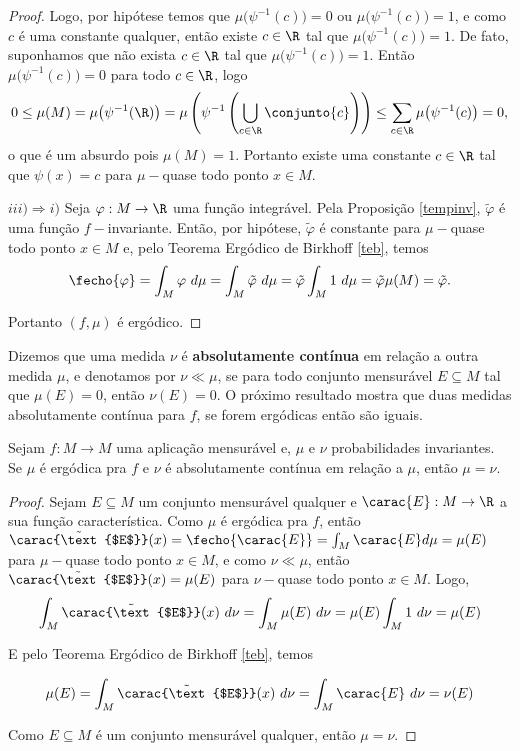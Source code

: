 \begin{proof}
Logo, por hipótese temos que $\mu\big(\psi^{-1}(c)\big)=0$ ou $\mu\big(\psi^{-1}(c)\big)=1$, e como $c$ é uma constante qualquer, então existe $c\in\R$ tal que $\mu\big(\psi^{-1}(c)\big)=1$. De fato, suponhamos que não exista $c\in\R$ tal que $\mu\big(\psi^{-1}(c)\big)=1$. Então $\mu\big(\psi^{-1}(c)\big)=0$ para todo $c\in\R$, logo
\begin{equation*}
0\leq\mu(M)=\mu\big(\psi^{-1}(\R)\big)=\mu\left(\psi^{-1}\left(\bigcup_{c\in\R}\conjunto{c}\right)\right)\leq\sum_{c\in\R}\mu\big(\psi^{-1}(c)\big)=0,
\end{equation*}
o que é um absurdo pois $\mu(M)=1$. Portanto existe uma constante $c\in\R$ tal que $\psi(x)=c$ para $\mu-$quase todo ponto $x\in M$.

$iii) \Rightarrow i)$ Seja $\varphi:M\to\R$ uma função integrável. Pela Proposição \ref{tempinv}, $\tilde{\varphi}$ é uma função $f-$invariante. Então, por hipótese, $\tilde{\varphi}$ é constante para $\mu-$quase todo ponto $x\in M$ e, pelo Teorema Ergódico de Birkhoff \ref{teb}, temos
\begin{equation*}
\fecho{\varphi}=\int_{M}{\varphi\ d\mu}=\int_{M}{\tilde{\varphi}\ d\mu}=\tilde{\varphi}\int_{M}{1\ d\mu}=\tilde{\varphi}\mu(M)=\tilde{\varphi}.
\end{equation*}

Portanto $(f,\mu)$ é ergódico.
\end{proof}

Dizemos que uma medida $\nu$ é \textbf{absolutamente contínua} em relação a outra medida $\mu$, e denotamos por $\nu\ll\mu$, se para todo conjunto mensurável $E\subseteq M$ tal que $\mu(E)=0$, então $\nu(E)=0$. O próximo resultado mostra que duas medidas absolutamente contínua para $f$, se forem ergódicas então são iguais.

\begin{proposicao} Sejam $f:M\to M$ uma aplicação mensurável e, $\mu$ e $\nu$ probabilidades invariantes. Se $\mu$ é ergódica pra $f$ e $\nu$ é absolutamente contínua em relação a $\mu$, então $\mu=\nu$.
\end{proposicao}

\begin{proof} Sejam $E\subseteq M$ um conjunto mensurável qualquer e $\carac{E}:M\to\R$ a sua função característica. Como $\mu$ é ergódica pra $f$, então $\tilde{\carac{\text{$E$}}}(x)=\fecho{\carac{E}}=\int_{M}{\carac{E}}d\mu=\mu(E)$ para $\mu-$quase todo ponto $x\in M$, e como $\nu\ll\mu$, então $\tilde{\carac{\text{$E$}}}(x)=\mu(E)$ para $\nu-$quase todo ponto $x\in M$. Logo, 
\begin{equation*}
\int_{M}\tilde{\carac{\text{$E$}}}(x)\ d\nu=\int_{M}\mu(E)\ d\nu=\mu(E)\int_{M}1\ d\nu=\mu(E)
\end{equation*}

E pelo Teorema Ergódico de Birkhoff \ref{teb}, temos

\begin{equation*}
\mu(E)=\int_{M}\tilde{\carac{\text{$E$}}}(x)\ d\nu=\int_{M}\carac{E}\ d\nu=\nu(E)
\end{equation*}

Como $E\subseteq M$ é um conjunto mensurável qualquer, então $\mu=\nu$.
\end{proof}

